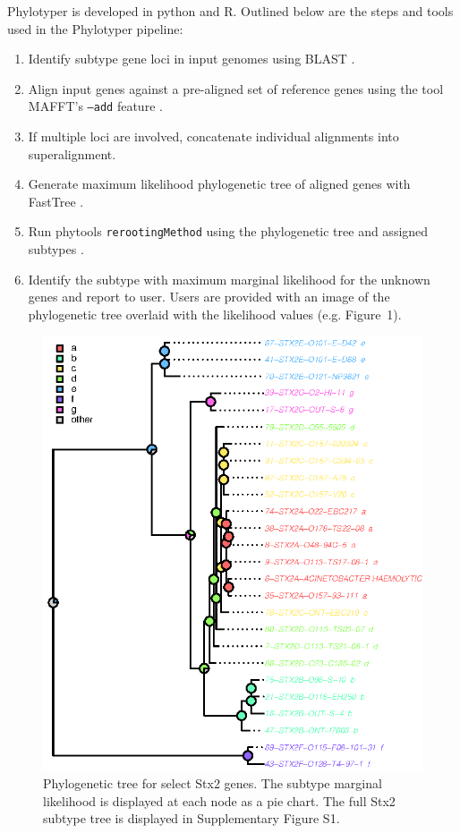 \documentclass{bioinfo}
\begin{document}
Phylotyper is developed in python and R. 
Outlined below are the steps and tools used in the Phylotyper pipeline:

\begin{enumerate}
\item Identify subtype gene loci in input genomes using BLAST \citep{Camacho2009}.
\item Align input genes against a pre-aligned set of reference genes using the tool MAFFT's \texttt{--add} feature \citep{Katoh2013,CapellaGutierrez2009}.
\item If multiple loci are involved, concatenate individual alignments into superalignment.
\item Generate maximum likelihood phylogenetic tree of aligned genes with FastTree \citep{Price2010}.
\item Run phytools \texttt{rerootingMethod} using the phylogenetic tree and assigned subtypes \citep{Revell2011}.
\item Identify the subtype with maximum marginal likelihood for the unknown genes and report to user.
Users are provided with an image of the phylogenetic tree overlaid with the likelihood values (e.g. Figure~1\vphantom{\ref{fig:01}}).
\end{enumerate}

\begin{figure}[!tpb]%
\centerline{\includegraphics{fig01.eps}}
\caption{Phylogenetic tree for select Stx2 genes. 
The subtype marginal likelihood is displayed at each node as a pie chart.
The full Stx2 subtype tree is displayed in Supplementary Figure S1.}\label{fig:01}
\end{figure}
\end{document}
